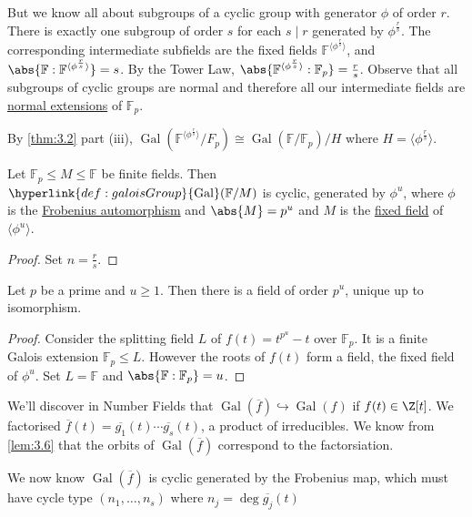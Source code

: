 \documentclass{article}
\DeclareMathOperator{\Gal}{Gal}
\newcommand{\F}{\mathbb{F}}
\begin{document}
But we know all about subgroups of a cyclic group with generator $\phi$ of order $r$.
There is exactly one subgroup of order $s$ for each $s \mid r$ generated by $\phi^\frac{r}{s}$.
The corresponding intermediate subfields are the fixed fields $\F^{\langle \phi^\frac{r}{s} \rangle}$, and $\abs{\F:\F^{\langle \phi^\frac{r}{s} \rangle}} = s$.
By the Tower Law, $\abs{\F^{\langle \phi^\frac{r}{s} \rangle}:\F_p} = \frac{r}{s}$.
Observe that all subgroups of cyclic groups are normal and therefore all our intermediate fields are \hyperlink{def:normal}{normal extensions} of $\F_p$.

By \cref{thm:3.2} part (iii), $\Gal(\F^{\langle \phi^\frac{r}{s} \rangle}/F_p) \cong \Gal(\F/\F_p) / H$ where $H = \langle \phi^\frac{r}{s} \rangle$.

\begin{ncor}\label{cor:3.17}
    Let $\F_p \leq M \leq \F$ be finite fields.
    Then $\hyperlink{def:galoisGroup}{\Gal}(\F/M)$ is cyclic, generated by $\phi^u$, where $\phi$ is the \hyperlink{def:frob}{Frobenius automorphism} and $\abs{M} = p^u$ and $M$ is the \hyperlink{def:fixedField}{fixed field} of $\langle \phi^u \rangle$.
\end{ncor}

\begin{proof}
    Set $n = \frac{r}{s}$.
\end{proof}

\begin{nthm}\label{thm:3.18}
    Let $p$ be a prime and $u \geq 1$.
    Then there is a field of order $p^u$, unique up to isomorphism.
\end{nthm}

\begin{proof}
    Consider the splitting field $L$ of $f(t) = t^{p^u} - t$ over $\F_p$.
    It is a finite Galois extension $\F_p \leq L$.
    However the roots of $f(t)$ form a field, the fixed field of $\phi^u$.
    Set $L = \F$ and $\abs{\F :\F_p} = u$.
\end{proof}

\begin{remark}
    We'll discover in Number Fields that $\Gal(\overline{f}) \hookrightarrow \Gal(f)$ if $f(t) \in \Z[t]$.
    We factorised $\overline{f}(t) = \overline{g_1}(t) \dotsm \overline{g_s}(t)$, a product of irreducibles.
    We know from \cref{lem:3.6} that the orbits of $\Gal(\overline{f})$ correspond to the factorsiation.

    We now know $\Gal(\overline{f})$ is cyclic generated by the Frobenius map, which must have cycle type $(n_1, \dotsc, n_s)$ where $n_j = \deg \overline{g_j}(t)$
\end{remark}
\end{document}
